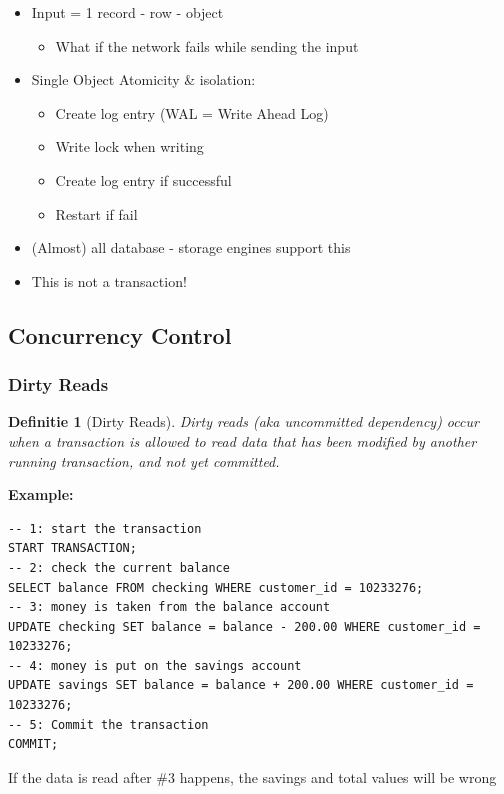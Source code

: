 \documentclass{article}
\newtheorem{theorem}{Definitie}[section]
\begin{document}
\begin{itemize}
    \item Input = 1 record - row - object
    \begin{itemize}
        \item What if the network fails while sending the input
    \end{itemize}
    \item Single Object Atomicity \& isolation:
    \begin{itemize}
        \item Create log entry (WAL = Write Ahead Log)
        \item Write lock when writing
        \item Create log entry if successful
        \item Restart if fail
    \end{itemize}
    \item (Almost) all database - storage engines support this
    \item This is not a transaction!
\end{itemize}

\subsection{Concurrency Control}

\subsubsection{Dirty Reads}

\begin{theorem}[Dirty Reads]
Dirty reads (aka uncommitted dependency) occur when a transaction is allowed 
to read data that has been modified by another running transaction, 
and not yet committed.
\end{theorem}

\textbf{Example: } 

\begin{verbatim}
-- 1: start the transaction
START TRANSACTION;
-- 2: check the current balance
SELECT balance FROM checking WHERE customer_id = 10233276;
-- 3: money is taken from the balance account
UPDATE checking SET balance = balance - 200.00 WHERE customer_id = 10233276;
-- 4: money is put on the savings account
UPDATE savings SET balance = balance + 200.00 WHERE customer_id = 10233276;
-- 5: Commit the transaction
COMMIT;
\end{verbatim}

If the data is read after \#3 happens, the savings and total values will be wrong
\end{document}
